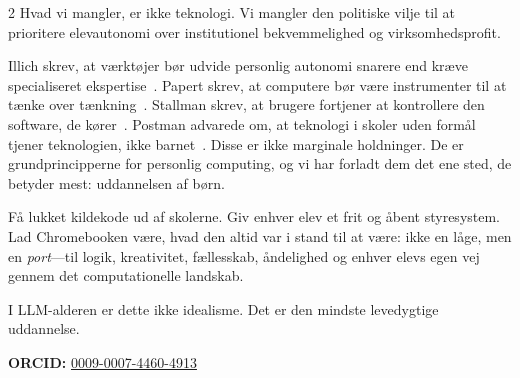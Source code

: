 \documentclass[11pt, a4paper]{article}
\begin{document}
\begin{multicols}{2}
Hvad vi mangler, er ikke teknologi. Vi mangler den politiske vilje til at prioritere elevautonomi over institutionel bekvemmelighed og virksomhedsprofit.

Illich skrev, at værktøjer bør udvide personlig autonomi snarere end kræve specialiseret ekspertise~\citep{illich1973tools}. Papert skrev, at computere bør være instrumenter til at tænke over tænkning~\citep{papert1980mindstorms}. Stallman skrev, at brugere fortjener at kontrollere den software, de kører~\citep{stallman2002free}. Postman advarede om, at teknologi i skoler uden formål tjener teknologien, ikke barnet~\citep{postman1995end}. Disse er ikke marginale holdninger. De er grundprincipperne for personlig computing, og vi har forladt dem det ene sted, de betyder mest: uddannelsen af børn.

Få lukket kildekode ud af skolerne. Giv enhver elev et frit og åbent styresystem. Lad Chromebooken være, hvad den altid var i stand til at være: ikke en låge, men en \emph{port}---til logik, kreativitet, fællesskab, åndelighed og enhver elevs egen vej gennem det computationelle landskab.

I LLM-alderen er dette ikke idealisme. Det er den mindste levedygtige uddannelse.

\vspace{0.5em}
\noindent\textbf{ORCID:} \href{https://orcid.org/0009-0007-4460-4913}{0009-0007-4460-4913}

\end{multicols}




\end{document}
